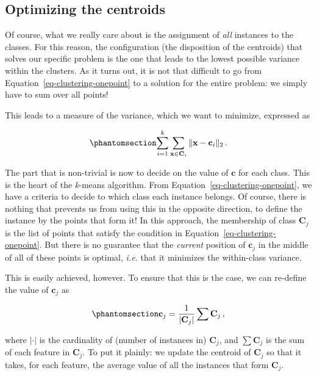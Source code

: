 \documentclass[
  letterpaper,
]{scrbook}
\begin{document}
\subsection{Optimizing the centroids}\label{optimizing-the-centroids}

Of course, what we really care about is the assignment of \emph{all}
instances to the classes. For this reason, the configuration (the
disposition of the centroids) that solves our specific problem is the
one that leads to the lowest possible variance within the clusters. As
it turns out, it is not that difficult to go from
Equation~\ref{eq-clustering-onepoint} to a solution for the entire
problem: we simply have to sum over all points!

This leads to a measure of the variance, which we want to minimize,
expressed as

\begin{equation}\phantomsection\label{eq-clustering-variance}{
\sum_{i=1}^k \sum_{\mathbf{x}\in \mathbf{C}_i} \|\mathbf{x} - \mathbf{c}_i\|_2 \,.
}\end{equation}

The part that is non-trivial is now to decide on the value of
\(\mathbf{c}\) for each class. This is the heart of the \emph{k}-means
algorithm. From Equation~\ref{eq-clustering-onepoint}, we have a
criteria to decide to which class each instance belongs. Of course,
there is nothing that prevents us from using this in the opposite
direction, to define the instance by the points that form it! In this
approach, the membership of class \(\mathbf{C}_j\) is the list of points
that satisfy the condition in Equation~\ref{eq-clustering-onepoint}. But
there is no guarantee that the \emph{current} position of
\(\mathbf{c}_j\) in the middle of all of these points is optimal,
\emph{i.e.} that it minimizes the within-class variance.

This is easily achieved, however. To ensure that this is the case, we
can re-define the value of \(\mathbf{c}_j\) as

\begin{equation}\phantomsection\label{eq-clustering-centroid-update}{
\mathbf{c}_j = \frac{1}{|\mathbf{C}_j|}\sum\mathbf{C}_j \,,
}\end{equation}

where \(|\cdot|\) is the cardinality of (number of instances in)
\(\mathbf{C}_j\), and \(\sum \mathbf{C}_j\) is the sum of each feature
in \(\mathbf{C}_j\). To put it plainly: we update the centroid of
\(\mathbf{C}_j\) so that it takes, for each feature, the average value
of all the instances that form \(\mathbf{C}_j\).
\end{document}
